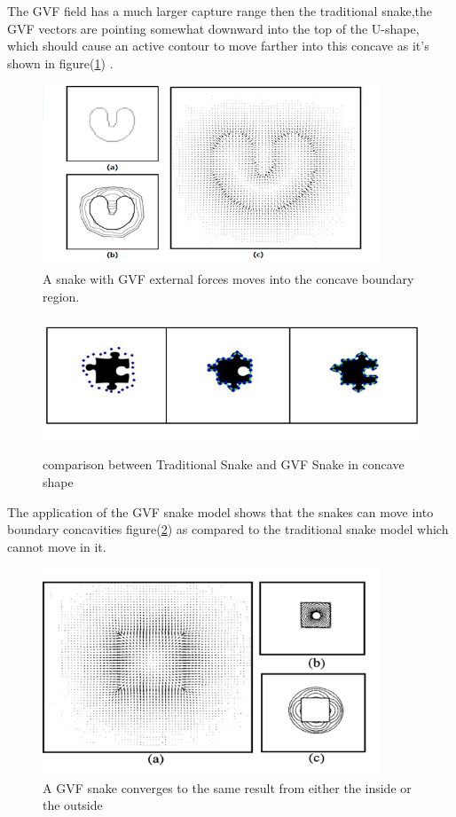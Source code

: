 \hspace{-0.6cm}The GVF field has a much larger capture range then the traditional snake,the GVF vectors are
pointing somewhat downward into the top of the U-shape, which
should cause an active contour to move farther into this concave as it's shown in figure(\ref{fig:figure6}) \cite{2.8}.\\
\begin{figure}[ht!]
        \centering
        \includegraphics[width=10cm]{chapiter2/figures/FIG6.png}
        \caption{A snake with GVF external forces moves into the concave boundary region.}
        \label{fig:figure6}
\end{figure}

\begin{figure}[ht!]
        \centering
        \includegraphics[width=15cm,height=4cm]{chapiter2/figures/FIG7.png}
        \caption{comparison between Traditional Snake and GVF Snake in concave shape}
        \label{fig:figure7}
\end{figure}
\hspace{-0.6cm}The application of the GVF snake model shows that the snakes can move into boundary concavities figure(\ref{fig:figure7})
as compared to the traditional snake model which cannot move in it.

\begin{figure}[ht!]
        \centering
        \includegraphics[width=10cm]{chapiter2/figures/FIG8.png}
        \caption{A GVF snake converges to the same result from either the inside or the outside \cite{2.8}}
        \label{fig:figure8}
\end{figure}

